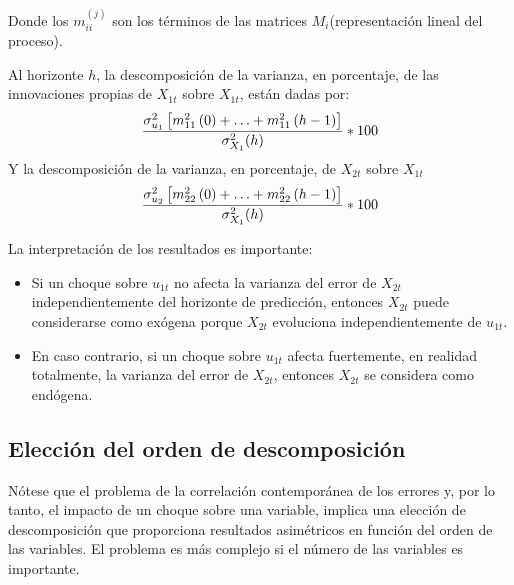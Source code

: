 \begin{enumerate}
Donde los $m_{ii}^{(j)}$ son los t\'{e}rminos de las matrices $M_{i} $(representaci\'{o}n lineal del proceso).

Al horizonte $h$, la descomposici\'{o}n de la varianza, en porcentaje, de las innovaciones propias de $X_{1t}$ sobre $X_{1t}$, est\'{a}n dadas por:
\[
\frac{\sigma_{u_{1}}^{2}\left[ m_{11}^{2}\left( 0 \right)+\mathellipsis +m_{11}^{2}\left( h-1 \right) \right]}{\sigma_{X_{1}}^{2}(h)}\ast 100
\]
Y la descomposici\'{o}n de la varianza, en porcentaje, de $X_{2t}$ sobre $X_{1t}$
\[
\frac{\sigma_{u_{2}}^{2}\left[ m_{22}^{2}\left( 0 \right)+\mathellipsis +m_{22}^{2}\left( h-1 \right) \right]}{\sigma_{X_{1}}^{2}(h)}\ast 100
\]

La interpretaci\'{o}n de los resultados es importante:
\begin{itemize}
      \item Si un choque sobre $u_{1t}$ no afecta la varianza del error de $X_{2t}$ independientemente del horizonte de predicci\'{o}n, entonces $X_{2t}$ puede considerarse como ex\'{o}gena porque $X_{2t}$ evoluciona independientemente de $u_{1t}$.
      \item En caso contrario, si un choque sobre $u_{1t}$ afecta fuertemente, en realidad totalmente, la varianza del error de $X_{2t}$, entonces $X_{2t}$ se considera como end\'{o}gena.
\end{itemize}

\subsection{Elecci\'{o}n del orden de descomposici\'{o}n}
N\'{o}tese que el problema de la correlaci\'{o}n contempor\'{a}nea de los errores y, por lo tanto, el impacto de un choque sobre una variable, implica una elecci\'{o}n de descomposici\'{o}n que proporciona resultados asim\'{e}tricos en funci\'{o}n del orden de las variables. El problema es m\'{a}s complejo si el n\'{u}mero de las variables es importante.


\end{enumerate}
